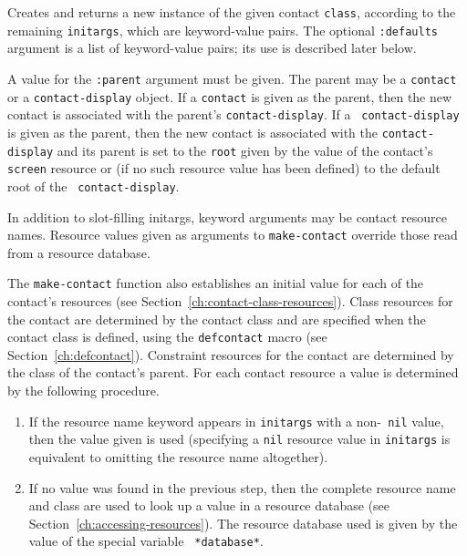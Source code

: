 \begin{flushright}
\parbox[t]{6.125in}{
Creates and returns a new
instance of the given contact {\tt class}, according to the remaining
{\tt initargs}, 
which are keyword-value pairs. The optional {\tt :defaults} argument is a list
of keyword-value pairs; its use is described later below.}

\parbox[t]{6.125in}{
A value for the {\tt :parent} argument must be
given. The parent may be a {\tt contact} or a {\tt contact-display} object.
If a  {\tt contact} is given as the parent, then the new contact is associated
with the parent's {\tt contact-display}. If a {\tt
contact-display}  is given as the parent, then the new contact is associated
with the {\tt contact-display} and its parent is set to the {\tt root} 
given by the value of the contact's {\tt screen} resource or (if no such
resource value has been defined) to the default root of the {\tt
contact-display}.
}

\parbox[t]{6.125in}{
In addition to slot-filling initargs, keyword arguments may be contact resource
names. Resource values given as arguments to {\tt make-contact} override
those read from a resource database.

}

\parbox[t]{6.125in}{
The {\tt make-contact} function also establishes an initial value for each of the
contact's resources (see Section~\ref{ch:contact-class-resources}). 
Class resources for the contact are determined by the
contact class and are specified when the contact class is defined, using the
{\tt defcontact} macro
(see Section~\ref{ch:defcontact}). Constraint resources for the contact
are determined by the class of the contact's parent. 
For each contact resource 
a value is determined by the following procedure.

\begin{enumerate}
\item If the resource name keyword appears in {\tt initargs} with a
non-{\tt
nil} value, then the value given is used (specifying a {\tt nil} resource value
in {\tt initargs} is equivalent to omitting the resource name altogether).

\item If no value was found in the previous step, then  the complete resource
name and
class are used to look up a value in a resource database
 (see Section~\ref{ch:accessing-resources}). 
The resource database used is given by the value of the special variable {\tt
*database*}.


\end{enumerate}}
\end{flushright}
